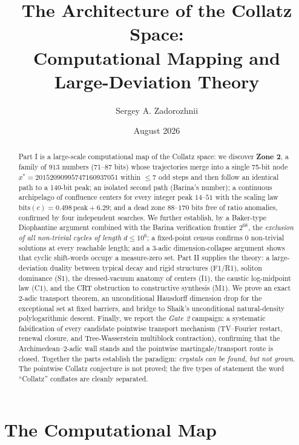 \documentclass[12pt,a4paper]{article}
\title{The Architecture of the Collatz Space:\\
Computational Mapping and Large-Deviation Theory}
\author{Sergey A. Zadorozhnii}
\date{August 2026}
\theoremstyle{remark}
\begin{document}
\maketitle

\begin{abstract}
Part I is a large-scale computational map of the Collatz space: we discover
\textbf{Zone 2}, a family of $913$ numbers (71--87 bits) whose trajectories
merge into a single 75-bit node $x^*=20152090995747160937051$ within $\le7$
odd steps and then follow an identical path to a 140-bit peak; an isolated
second path (Barina's number); a continuous archipelago of confluence centers
for every integer peak $14$--$51$ with the scaling law
$\mathrm{bits}(c)=0.498\,\mathrm{peak}+6.29$; and a dead zone $88$--$170$ bits
free of ratio anomalies, confirmed by four independent searches. We further
establish, by a Baker-type Diophantine argument combined with the Barina
verification frontier $2^{68}$, the \emph{exclusion of all non-trivial cycles
of length $d\le10^{6}$}; a fixed-point census confirms $0$ non-trivial solutions
at every reachable length; and a $3$-adic dimension-collapse argument shows that
cyclic shift-words occupy a measure-zero set. Part II supplies the theory: a
large-deviation duality between typical decay and rigid structures (F1/R1),
soliton dominance (S1), the dressed-vacuum anatomy of centers (I1), the caustic
log-midpoint law (C1), and the CRT obstruction to constructive synthesis (M1).
We prove an exact $2$-adic transport theorem, an unconditional Hausdorff
dimension drop for the exceptional set at fixed barriers, and bridge to Shaik's
\cite{Shaik2026} unconditional natural-density polylogarithmic descent. Finally,
we report the \emph{Gate 2} campaign: a systematic falsification of every
candidate pointwise transport mechanism (TV--Fourier restart, renewal closure,
and Tree-Wasserstein multiblock contraction), confirming that the
Archimedean--$2$-adic wall stands and the pointwise martingale/transport route
is closed. Together the parts establish the paradigm: \emph{crystals can be
found, but not grown}. The pointwise Collatz conjecture is not proved; the five
types of statement the word ``Collatz'' conflates are cleanly separated.
\end{abstract}

\tableofcontents

\part{The Computational Map}
\label{part:map}
\end{document}
